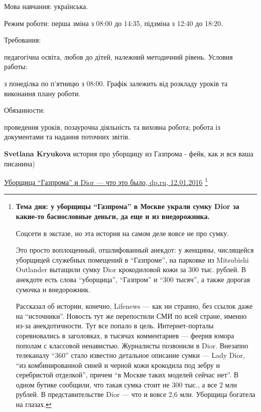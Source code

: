 \begin{itemize}
\begin{itemize}
{Мова навчання: українська.

Режим роботи: перша зміна з 08:00 до 14:35, підзміна з 12:40 до 18:20.

Требования:

педагогічна освіта, любов до дітей, належний методичний рівень.
Условия работы:

з понеділка по п’ятницю з 08:00. Графік залежить від розкладу уроків та виконання плану роботи.

Обязанности:

проведення уроків,
позаурочна діяльність та виховна робота;
робота із документами та надання поточних звітів.
}

 
\textbf{Svetlana Kryukova} история про уборщицу из Газпрома - фейк, как и вся ваша писанина)

\href{https://www.dp.ru/a/2016/01/12/Uborshhica_Gazproma_i_Dio}{Уборщица \enquote{Газпрома} и Dior — что это было, dp.ru, 12.01.2016}
\footnote{
{\bfseries Тема дня: у уборщицы \enquote{Газпрома} в Москве украли сумку Dior за какие-то
баснословные деньги, да еще и из внедорожника.}

Соцсети в экстазе, но эта
история на самом деле вовсе не про сумку.  

Это просто воплощенный,
отшлифованный анекдот: у женщины, числящейся уборщицей служебных помещений в
\enquote{Газпроме}, на парковке из Mitsubishi Outlander вытащили сумку Dior
крокодиловой кожи за 300 тыс. рублей. В анекдоте есть слова \enquote{уборщица},
\enquote{Газпром} и \enquote{300 тысяч}, а также дорогая сумочка и внедорожник.

Рассказал об истории, конечно, Lifenews — как ни странно, без ссылок даже на
\enquote{источники}. Новость тут же перепостили СМИ по всей стране, именно из-за
анекдотичности. Тут все попало в цель. Интернет-порталы соревновались в
заголовках, в тысячах комментариев — феерия юмора пополам с классовой
ненавистью. Журналисты позвонили в Dior. Внезапно телеканалу \enquote{360} стало
известно детальное описание сумки — Lady Dior, \enquote{из комбинированной синей и
черной кожи крокодила под зебру и серебристой отделкой}, причем \enquote{в Москве таких
моделей сейчас нет}. В одном бутике сообщили, что такая сумка стоит не 300
тыс., а все 2 млн рублей. В представительстве Dior — что и вовсе 2,6 млн.
Уборщица богатела на глазах.

}
\end{itemize}
\end{itemize}
